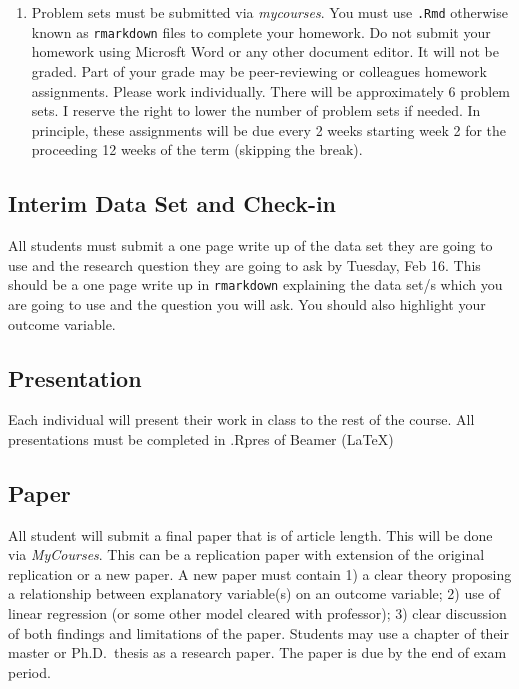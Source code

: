 \documentclass[11pt,]{article}
\providecommand{\tightlist}{%
  \setlength{\itemsep}{0pt}\setlength{\parskip}{0pt}}
\begin{document}
\begin{enumerate}
\def\labelenumi{\arabic{enumi}.}
\tightlist
\item
  Problem sets must be submitted via \emph{mycourses}. You must use
  \texttt{.Rmd} otherwise known as \texttt{rmarkdown} files to complete
  your homework. Do not submit your homework using Microsft Word or any
  other document editor. It will not be graded. Part of your grade may
  be peer-reviewing or colleagues homework assignments. Please work
  individually. There will be approximately 6 problem sets. I reserve
  the right to lower the number of problem sets if needed. In principle,
  these assignments will be due every 2 weeks starting week 2 for the
  proceeding 12 weeks of the term (skipping the break).
\end{enumerate}

\subsection{Interim Data Set and
Check-in}\label{interim-data-set-and-check-in}

All students must submit a one page write up of the data set they are
going to use and the research question they are going to ask by Tuesday,
Feb 16. This should be a one page write up in \texttt{rmarkdown}
explaining the data set/s which you are going to use and the question
you will ask. You should also highlight your outcome variable.

\subsection{Presentation}\label{presentation}

Each individual will present their work in class to the rest of the
course. All presentations must be completed in .Rpres of Beamer (LaTeX)

\subsection{Paper}\label{paper}

All student will submit a final paper that is of article length. This
will be done via \emph{MyCourses}. This can be a replication paper with
extension of the original replication or a new paper. A new paper must
contain 1) a clear theory proposing a relationship between explanatory
variable(s) on an outcome variable; 2) use of linear regression (or some
other model cleared with professor); 3) clear discussion of both
findings and limitations of the paper. Students may use a chapter of
their master or Ph.D.~thesis as a research paper. The paper is due by
the end of exam period.
\end{document}
